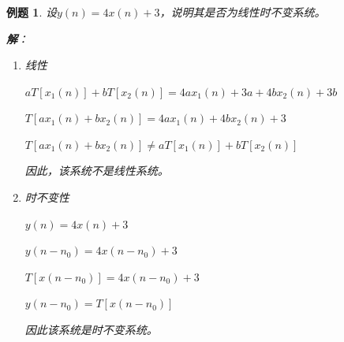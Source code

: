 \documentclass[notheorems,compress,mathserif,table]{beamer}
\newtheorem{example}{例题}
\begin{document}
\begin{frame}\frametitle{}%
\begin{example}
设$y(n)=4x(n)+3$，说明其是否为线性时不变系统。%
\par\textbf{解}：
\begin{enumerate}
  \item 线性\par
        $aT[x_{1}(n)] + bT[x_{2}(n)]= 4ax_{1}(n)+3a + 4bx_{2}(n)+3b$\par
        $T[ax_{1}(n)+bx_{2}(n)] =  4ax_{1}(n) + 4bx_{2}(n)+3$\par
        $T[ax_{1}(n)+bx_{2}(n)] \neq  aT[x_{1}(n)] + bT[x_{2}(n)]$\par
        因此，该系统不是线性系统。
  \item 时不变性\par  %
        $y(n) = 4x(n) +3$\par
        $y(n-n_{0}) = 4x(n-n_{0}) + 3$\par
        $T[x(n-n_{0})] =  4x(n-n_{0}) + 3$\par
        $y(n-n_{0}) = T[x(n-n_{0})]$\par
        因此该系统是时不变系统。
\end{enumerate}
\end{example}
\end{frame}
\end{document}
